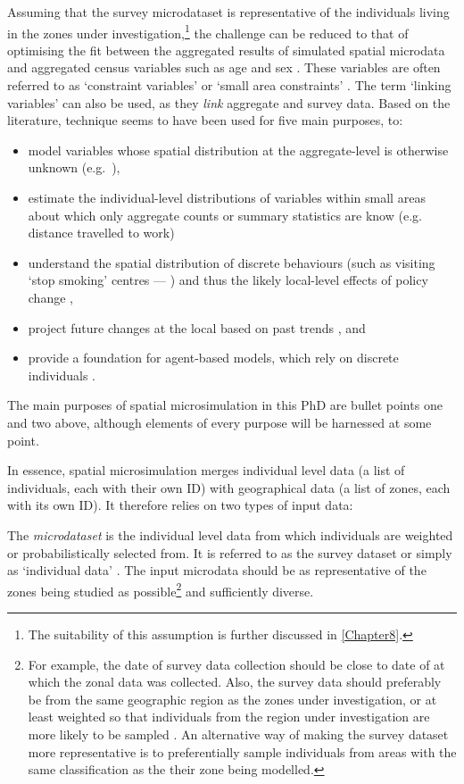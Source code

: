 Assuming that the survey microdataset is representative of the
individuals living in the zones under investigation,\footnote{The suitability
of this assumption is further discussed in \cref{Chapter8}.} the
challenge can be reduced to that of optimising the fit between
the aggregated results of simulated
spatial microdata and aggregated census variables such as age
and sex \citep{Williamson1998}. These variables are often
referred to as `constraint variables' or `small area constraints'
\citep{Hermes2012a}. The term `linking variables' can also be used, as they
\emph{link} aggregate and survey data.
Based on the literature, technique seems to have been used for five main
purposes, to:
\begin{itemize}
 \item model variables whose spatial distribution at the aggregate-level is
otherwise unknown (e.g.~\citealp{Ballas1999}),
\item estimate the individual-level distributions of variables within small
areas about which only aggregate counts or summary statistics are know (e.g.
distance travelled to work)
\item understand the spatial distribution of discrete behaviours
(such as visiting `stop smoking' centres --- \citealp{Tomintz2008})
and thus the likely local-level effects of policy change \citep{Ballas2001}, 
\item project future changes at the local based on past trends
\citep{Ballas2005}, and
\item provide a foundation for agent-based models, which rely on
discrete individuals \citep{Ballas2007simb, Pritchard2012}.
\end{itemize}
The main purposes of spatial microsimulation in this PhD are bullet points one
and two above, although elements of every purpose will be harnessed at some
point.

In essence, spatial microsimulation merges individual level data (a list
of individuals, each with their own ID) with geographical data (a list of
zones, each with its own ID). It therefore relies on two types of input data:

The \emph{microdataset} is the individual level data from which individuals are
weighted or probabilistically selected from. It is referred to as the survey
dataset \citep{Wu2008} or simply as `individual data' \citep{Simpson2005}.
The input microdata should be as representative of the zones being studied as
possible\footnote{For
example, the date of survey data collection should be
close to date of at which the zonal data was collected. Also, the survey data
should preferably be from the same geographic region as the zones under
investigation, or at least weighted so that individuals from the region under
investigation are more likely to be sampled \citep{Ballas2005a}. An alternative
way of making the survey dataset more representative is to preferentially
sample individuals from areas with the same classification as the 
their zone being modelled.
}
and sufficiently diverse. %

